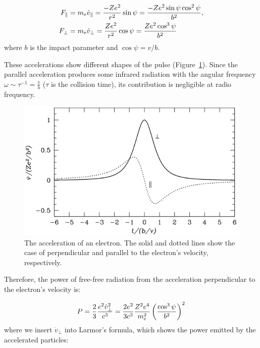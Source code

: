 \begin{align}
    F_{\|} &= m_{\mathrm{e}} \dot{v}_{\|}=\frac{-Z e^{2}}{r^{2}} \sin \psi=\frac{-Z e^{2} \sin \psi \cos ^{2} \psi}{b^{2}},\label{eq:essential_radio4n15}\\
    F_{\perp} &= m_{\mathrm{e}} \dot{v}_{\perp}=\frac{Z e^{2}}{r^{2}} \cos \psi=\frac{Z e^{2} \cos ^{3} \psi}{b^{2}}\label{eq:essential_radio4n16}
\end{align}
where $b$ is the impact parameter and $\cos\psi = v/b$.

These accelerations show different shapes of the pulse (Figure~\ref{fig:nrao_radio4n3}).
Since the parallel acceleration produces some infrared radiation with the angular frequency $\omega \sim \tau^{-1} = \frac{v}{b}$ ($\tau$ is the collision time), its contribution is negligible at radio frequency.

\begin{figure}[htbp]
\centering
	\includegraphics[width=.8\linewidth]{Chapter_2/Figures/NRAO_radio4n3.png}
    \caption[The acceleration of an electron by an ion]{\label{fig:nrao_radio4n3}
        The acceleration of an electron.
        The solid and dotted lines show the case of perpendicular and parallel to the electron's velocity, respectively.
    }
\end{figure}

Therefore, the power of free-free radiation from the acceleration perpendicular to the electron's velocity is:

\begin{equation}\label{eq:essential_radio4n17}
    P=\frac{2}{3} \frac{e^{2} \dot{v}_{\perp}^{2}}{c^{3}}=\frac{2 e^{2}}{3 c^{3}} \frac{Z^{2} e^{4}}{m_{\mathrm{e}}^{2}}\left(\frac{\cos ^{3} \psi}{b^{2}}\right)^{2}
\end{equation}
where we insert $\dot{v}_{\perp}$ into Larmor's formula, which shows the power emitted by the accelerated particles:

